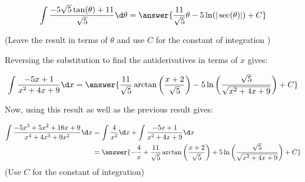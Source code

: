 \documentclass{ximera}
\begin{document}
\begin{exercise}
\begin{exercise}
\begin{exercise}
\begin{exercise}
\begin{exercise}
\begin{exercise}
\begin{exercise}
\begin{exercise}
\begin{exercise}
\[
\int   \frac{-5\sqrt{5}\tan(\theta)+11}{\sqrt{5}}  \d \theta = \answer{\frac{11}{\sqrt{5}}\theta -5\ln(|\sec(\theta)|)+C}
\]

(Leave the result in terms of $\theta$ and use $C$ for the constant of integration )

\begin{exercise}

Reversing the substitution to find the antiderivatives in terms of $x$ gives:

\[\int \frac{-5x+1}{x^{2}+4x+9} \d x =\answer{\frac{11}{\sqrt{5}}\arctan\left(\frac{x+2}{\sqrt{5}}\right)
- 5\ln\left(\frac{\sqrt{5}}{\sqrt{x^{2}+4x+9}}\right) + C}
\]

\begin{exercise}

Now, using this result as well as the previous result gives:

\begin{align*}
\int \frac{-5x^{3}+5x^{2}+16x+9}{x^{4}+4x^{3}+9x^{2}} \d x &= \int \frac{4}{x^{2}} \d x + \int \frac{-5x+1}{x^{2}+4x+9} \d x \\
&=\answer{-\frac{4}{x}+\frac{11}{\sqrt{5}}\arctan\left(\frac{x+2}{\sqrt{5}}\right) + 5\ln\left(\frac{\sqrt{5}}{\sqrt{x^{2}+4x+9}}\right) + C}
\end{align*}
(Use $C$ for the constant of integration)
 
\end{exercise}
\end{exercise}
\end{exercise}
\end{exercise}
\end{exercise}
\end{exercise} 
\end{exercise}
\end{exercise}
\end{exercise}
\end{exercise}
\end{exercise}
\end{document}
